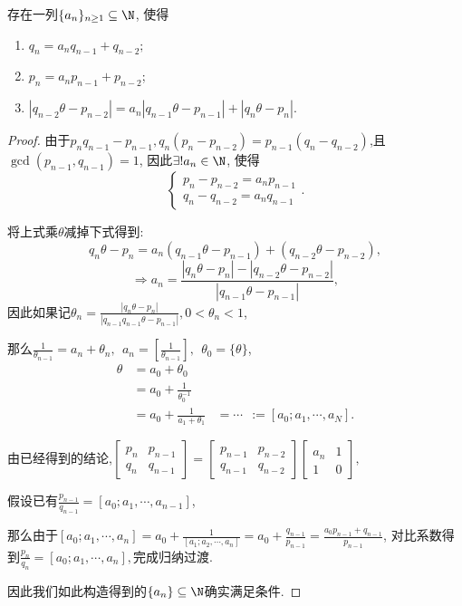\begin{lemma}
    存在一列$\{a_n\}_{n\ge 1} \subseteq \N$, 使得
    \begin{enumerate}
        \item $ q_n = a_n q_{n-1} + q_{n-2}; $
        \item $p_n = a_n p_{n-1} + p_{n-2}$;
        \item $|q_{n-2} \theta - p_{n-2}| = a_n |q_{n-1} \theta - p_{n-1}| + |q_n \theta - p_n|$.
    \end{enumerate}

\end{lemma}
\begin{proof}
    由于$p_n q_{n-1} - p_{n-1}, q_n(p_n-p_{n-2}) = p_{n-1}(q_n- q_{n-2})$,且$\gcd(p_{n-1}, q_{n-1}) = 1$,
    因此$\exists ! a_n \in \N$, 使得\[\begin{cases}
        p_n - p_{n-2} = a_n p_{n-1} \\
        q_n - q_{n-2} = a_n q_{n-1}
    \end{cases}.\]
    
    将上式乘$\theta$减掉下式得到:
    $$q_n \theta - p_n = a_n(q_{n-1} \theta - p_{n-1}) + (q_{n-2} \theta - p_{n-2}),$$
    $$ \Rightarrow a_n = \frac{|q_n \theta - p_n| - |q_{n-2} \theta - p_{n-2}|}{|q_{n-1} \theta - p_{n-1}|},$$
    因此如果记$\theta_n = \frac{|q_n \theta - p_n|}{|q_{n-1} q_{n-1} \theta - p_{n-1}|}, 0 < \theta_n < 1$,
    
    那么$\frac{1}{\theta_{n-1}} = a_n + \theta_n, \ \  a_n = [\frac{1}{\theta_{n-1}}],\ \ \theta_0 = \{ \theta \}$,
    \begin{align}
        \theta &= a_0 + \theta_0 \\
            &= a_0 + \frac{1}{\theta_0 ^{-1}} \\
             &= a_0 + \frac{1}{a_1 + \theta_1}
             &= \cdots \ \ := [a_0; a_1, \cdots, a_N].
    \end{align}

    由已经得到的结论,$\begin{bmatrix}
        p_n & p_{n-1} \\
        q_n & q_{n-1}
    \end{bmatrix}
    =\begin{bmatrix}
        p_{n-1} & p_{n-2} \\
        q_{n-1} & q_{n-2}
    \end{bmatrix}
    \begin{bmatrix}
        a_n & 1 \\
        1& 0
    \end{bmatrix},$
    
    假设已有$\frac{p_{n-1}}{q_{n-1}} = [a_0;a_1, \cdots, a_{n-1}]$,
    
    那么由于$[a_0; a_1,\cdots, a_n] = a_{0} + \frac{1}{[a_1;a_2,\cdots, a_n]} = a_0 + \frac {q_{n-1}}{p_{n-1}} = \frac{a_0 p_{n-1} + q_{n-1}}{p_{n-1}}$,
    对比系数得到$\frac{p_n}{q_n} = [a_0;a_1, \cdots, a_n],$完成归纳过渡.

    因此我们如此构造得到的$\{a_n\}\subseteq \N$确实满足条件. 

\end{proof}

